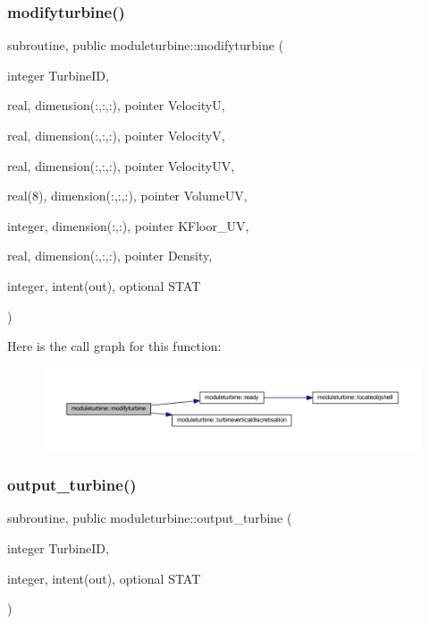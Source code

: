 \subsubsection{\texorpdfstring{modifyturbine()}{modifyturbine()}}
{\footnotesize\ttfamily subroutine, public moduleturbine\+::modifyturbine (\begin{DoxyParamCaption}\item[{integer}]{Turbine\+ID,  }\item[{real, dimension(\+:,\+:,\+:), pointer}]{VelocityU,  }\item[{real, dimension(\+:,\+:,\+:), pointer}]{VelocityV,  }\item[{real, dimension(\+:,\+:,\+:), pointer}]{Velocity\+UV,  }\item[{real(8), dimension(\+:,\+:,\+:), pointer}]{Volume\+UV,  }\item[{integer, dimension(\+:,\+:), pointer}]{K\+Floor\+\_\+\+UV,  }\item[{real, dimension(\+:,\+:,\+:), pointer}]{Density,  }\item[{integer, intent(out), optional}]{S\+T\+AT }\end{DoxyParamCaption})}

Here is the call graph for this function\+:\nopagebreak
\begin{figure}[H]
\begin{center}
\leavevmode
\includegraphics[width=350pt]{namespacemoduleturbine_a91250e475b9a5222abdd834b760515c6_cgraph}
\end{center}
\end{figure}
\mbox{\label{namespacemoduleturbine_ab12d2233fd93cc941831900a0b5713c9}} 
\subsubsection{\texorpdfstring{output\+\_\+turbine()}{output\_turbine()}}
{\footnotesize\ttfamily subroutine, public moduleturbine\+::output\+\_\+turbine (\begin{DoxyParamCaption}\item[{integer}]{Turbine\+ID,  }\item[{integer, intent(out), optional}]{S\+T\+AT }\end{DoxyParamCaption})}

